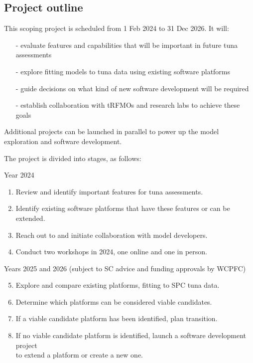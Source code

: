 \documentclass{SCreport}
\begin{document}
\newpage

\subsection{Project outline}
\label{sec:project-outline}

This scoping project is scheduled from 1 Feb 2024 to 31 Dec 2026. It will:

\begin{itemize}
  \item[-] evaluate features and capabilities that will be important in future
  tuna assessments\\[-4.5ex]
  \item[-] explore fitting models to tuna data using existing software
  platforms\\[-4.5ex]
  \item[-] guide decisions on what kind of new software development will be
  required\\[-4.5ex]
  \item[-] establish collaboration with tRFMOs and research labs to achieve
  these goals
\end{itemize}

Additional projects can be launched in parallel to power up the model
exploration and software development.

The project is divided into stages, as follows:

Year 2024

\begin{enumerate}
  \item Review and identify important features for tuna assessments.\\[-4.5ex]
  \item Identify existing software platforms that have these features or can be
  extended.\\[-4.5ex]
  \item Reach out to and initiate collaboration with model developers.\\[-4.5ex]
  \item Conduct two workshops in 2024, one online and one in person.\\
\end{enumerate}

Years 2025 and 2026 (subject to SC advice and funding approvals by WCPFC)

\begin{enumerate}\setcounter{enumi}{4}
  \item Explore and compare existing platforms, fitting to SPC tuna
  data.\\[-4.5ex]
  \item Determine which platforms can be considered viable candidates.\\[-4.5ex]
  \item If a viable candidate platform has been identified, plan
  transition.\\[-4.5ex]
  \item If no viable candidate platform is identified, launch a software
  development project\\
  to extend a platform or create a new one.
\end{enumerate}
\end{document}
